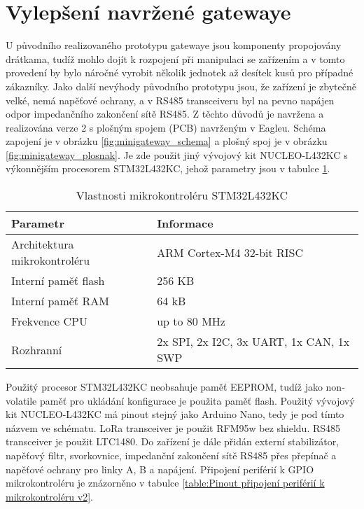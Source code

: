 \section{Vylepšení navržené gatewaye}
U původního realizovaného prototypu gatewaye jsou komponenty propojovány drátkama, tudíž mohlo dojít k rozpojení při manipulaci se zařízením a v tomto provedení by bylo náročné vyrobit několik jednotek až desítek kusů pro případné zákazníky.
Jako další nevýhody původního prototypu jsou, že zařízení je zbytečně velké, nemá napěťové ochrany, a v RS485 transceiveru byl na pevno napájen odpor impedančního zakončení sítě RS485.
Z těchto důvodů je navržena a realizována verze 2 s plošným spojem (PCB) navrženým v Eagleu.
Schéma zapojení je v obrázku \ref{fig:minigateway_schema} a plošný spoj je v obrázku \ref{fig:minigateway_plosnak}.
Je zde použit jiný vývojový kit NUCLEO-L432KC \cite{nucleo-l432KC_ST} s výkonnějším procesorem STM32L432KC, jehož parametry jsou v tabulce \ref{tab:mcuFeatures_stm43l432kc}. 

\begin{longtable}{|l|p{3.5cm}|}
    \caption{Vlastnosti mikrokontroléru STM32L432KC \cite{nucleo-l432KC_ST}}
    \label{tab:mcuFeatures_stm43l432kc} \\
    \hline

    Parametr          & Informace            \\ \hline \hline

    Architektura mikrokontroléru & ARM Cortex-M4 32-bit RISC \\ \hline
    Interní paměť flash       & 256 KB \\ \hline
    Interní paměť RAM         & 64 kB \\ \hline
    Frekvence CPU               & up to 80 MHz \\ \hline
    Rozhranní                  & 2x SPI, 2x I2C, 3x UART, 1x CAN, 1x SWP \\ \hline

\end{longtable}

Použitý procesor STM32L432KC neobsahuje paměť EEPROM, tudíž jako non-volatile paměť pro ukládání konfigurace je použita paměť flash.
Použitý vývojový kit NUCLEO-L432KC má pinout stejný jako Arduino Nano, tedy je pod tímto názvem ve schématu.
LoRa transceiver je použit RFM95w \cite{RFM95w} bez shieldu.
RS485 transceiver je použit LTC1480. 
Do zařízení je dále přidán externí stabilizátor, napěťový filtr, svorkovnice, impedanční zakončení sítě RS485 přes přepínač a napěťové ochrany pro linky A, B a napájení. 
Připojení periférií k GPIO mikrokontroléru je znázorněno v tabulce \ref{table:Pinout připojení periférií k mikrokontroléru v2}.

